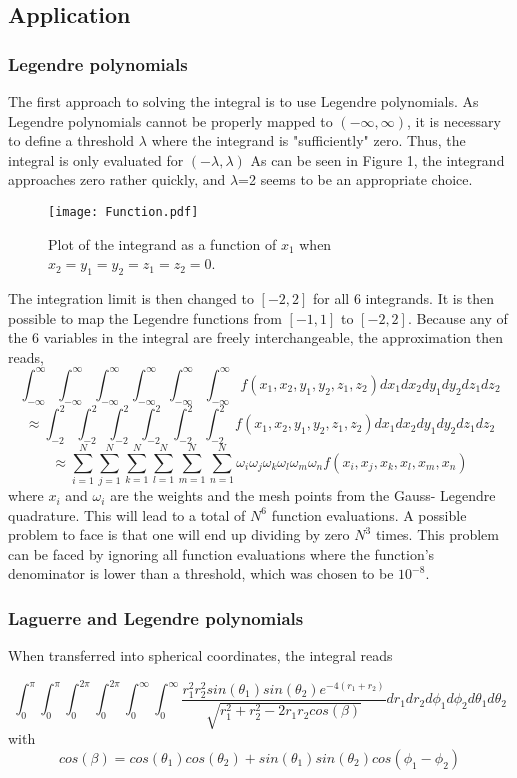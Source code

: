 \documentclass[10pt,a4paper]{article}
\begin{document}
\subsection{Application}
\subsubsection{Legendre polynomials}
The first approach to solving the integral is to use Legendre polynomials. As Legendre polynomials cannot be properly mapped to $(-\infty,\infty)$, it is necessary to define a threshold $\lambda$ where the integrand is "sufficiently" zero. Thus, the integral is only evaluated for $(-\lambda,\lambda)$ As can be seen in Figure 1, the integrand approaches zero rather quickly, and $\lambda$=2 seems to be an appropriate choice.
\begin{figure}[H]
\centering
\texttt{[image: Function.pdf]}
\caption[Plot of function]{Plot of the integrand as a function of $x_1$ when $x_2=y_1=y_2=z_1=z_2=0$.}
\end{figure}
The integration limit is then changed to $[-2,2]$ for all 6 integrands. It is then possible to map the Legendre functions from $[-1,1]$ to $[-2,2]$. Because any of the 6 variables in the integral are freely interchangeable, the approximation then reads,
$$\int_{-\infty}^{\infty}\int_{-\infty}^{\infty}\int_{-\infty}^{\infty}\int_{-\infty}^{\infty}\int_{-\infty}^{\infty}\int_{-\infty}^{\infty}f(x_1,x_2,y_1,y_2,z_1,z_2)dx_1dx_2dy_1dy_2dz_1dz_2$$
$$\approx\int_{-2}^{2}\int_{-2}^{2}\int_{-2}^{2}\int_{-2}^{2}\int_{-2}^{2}\int_{-2}^{2}f(x_1,x_2,y_1,y_2,z_1,z_2)dx_1dx_2dy_1dy_2dz_1dz_2 $$
$$\approx\sum_{i=1}^{N}\sum_{j=1}^{N}\sum_{k=1}^{N}\sum_{l=1}^{N}\sum_{m=1}^{N}\sum_{n=1}^{N}\omega_i\omega_j\omega_k\omega_l\omega_m\omega_nf(x_i,x_j,x_k,x_l,x_m,x_n)$$
where $x_i$ and $\omega_i$ are the weights and the mesh points from the Gauss- Legendre quadrature.
This will lead to a total of $N^6$ function evaluations. A possible problem to face is that one will end up dividing by zero $N^3$ times. This problem can be faced by ignoring all function evaluations where the function's denominator is lower than a threshold, which was chosen to be $10^{-8}$.
\subsubsection{Laguerre and Legendre polynomials}
When transferred into spherical coordinates, the integral reads

$$
\int_
{0}^{\pi}\int_{0}^{\pi}\int_{0}^{2\pi}\int_{0}^{2\pi}\int_{0}^{\infty}\int_{0}^{\infty}
\frac{r_1^2r_2^2sin(\theta_1)sin(\theta_2)e^{-4(r_1+r_2)}}{\sqrt{r_1^2+r_2^2-2r_1r_2cos(\beta)}}dr_1dr_2d\phi_1d\phi_2d\theta_1d\theta_2
$$
with
$$
cos(\beta)=cos(\theta_1)cos(\theta_2)+sin(\theta_1)sin(\theta_2)cos(\phi_1-\phi_2)
$$
\end{document}
